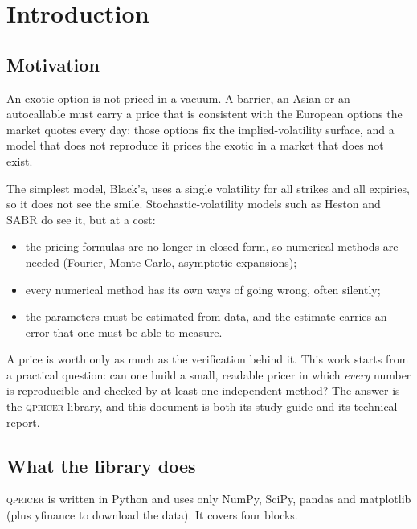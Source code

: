 \chapter*{Introduction}

\section*{Motivation}
An exotic option is not priced in a vacuum. A barrier, an Asian or an autocallable must carry a price that is
consistent with the European options the market quotes every day: those options fix the implied-volatility surface,
and a model that does not reproduce it prices the exotic in a market that does not exist.

The simplest model, Black's, uses a single volatility for all strikes and all expiries, so it does not see the smile.
Stochastic-volatility models such as Heston and SABR do see it, but at a cost:

\begin{itemize}
\item the pricing formulas are no longer in closed form, so numerical methods are needed (Fourier, Monte
Carlo, asymptotic expansions);
\item every numerical method has its own ways of going wrong, often silently;
\item the parameters must be estimated from data, and the estimate carries an error that one must be able to measure.
\end{itemize}

A price is worth only as much as the verification behind it. This work starts from a practical question: can one
build a small, readable pricer in which \emph{every} number is reproducible and checked by at least one independent
method? The answer is the \textsc{qpricer} library, and this document is both its study guide and its technical
report.

\section*{What the library does}
\textsc{qpricer} is written in Python and uses only NumPy, SciPy, pandas and matplotlib (plus yfinance to download the
data). It covers four blocks.


